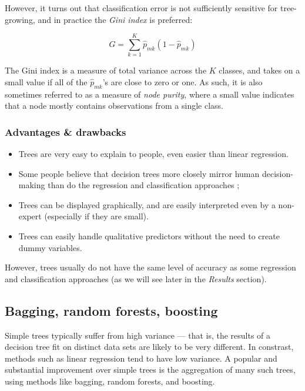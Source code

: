 However, it turns out that classification error is not sufficiently sensitive for tree-growing, and in practice the \textit{Gini index} is preferred:

\begin{equation}
    G = \sum_{k=1}^{K} \hat{p}_{mk}(1-\hat{p}_{mk})
\end{equation}

The Gini index is a measure of total variance across the $K$ classes, and takes on a small value if all of the $\hat{p}_{mk}$’s are close to zero or one. As such, it is also sometimes referred to as a measure of \textit{node purity}, where a small value indicates that a node mostly contains observations from a single class.


\subsubsection{Advantages \& drawbacks}
\begin{itemize}
    \item Trees are very easy to explain to people, even easier than linear regression.
    \item Some people believe that decision trees more closely mirror human decision-making than do the regression and classification approaches ;
    \item Trees can be displayed graphically, and are easily interpreted even by a non-expert (especially if they are small).
    \item Trees can easily handle qualitative predictors without the need to create dummy variables.
\end{itemize}

However, trees usually do not have the same level of accuracy as some regression and classification approaches (as we will see later in the \textit{Results} section).


\subsection{Bagging, random forests, boosting}

Simple trees typically suffer from high variance --- that is, the results of a decision tree fit on distinct data sets are likely to be very different. In constrast, methods such as linear regression tend to have low variance. A popular and substantial improvement over simple trees is the aggregation of many such trees, using methods like bagging, random forests, and boosting.

